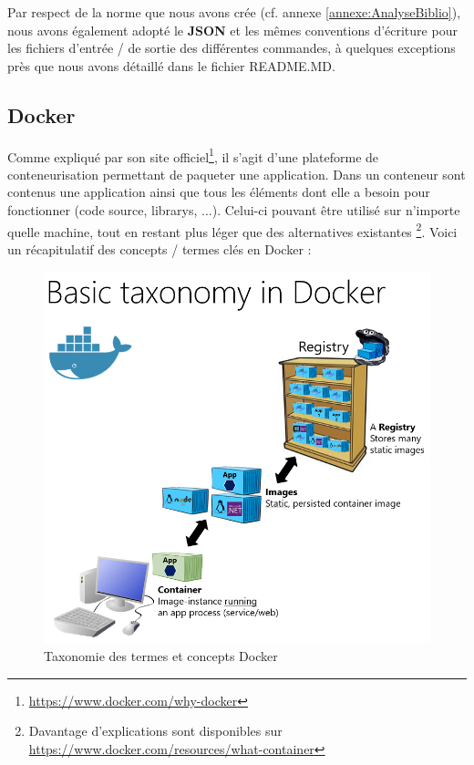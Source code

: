 Par respect de la norme que nous avons crée (cf. annexe \ref{annexe:AnalyseBiblio}), nous avons également adopté le \textbf{JSON} et les mêmes conventions d'écriture 
pour les fichiers d'entrée / de sortie des différentes commandes, à quelques exceptions près que nous avons détaillé dans le fichier README.MD. 

\pagebreak
\subsection{Docker}

Comme expliqué par son site officiel\footnote{
    \url{https://www.docker.com/why-docker}
}, il s'agit d'une plateforme de conteneurisation permettant de paqueter une application.
Dans un conteneur sont contenus une application ainsi que tous les éléments dont elle a besoin pour fonctionner (code source, \glspl{library}, ...).
Celui-ci pouvant être utilisé sur n'importe quelle machine, tout en restant plus léger que des alternatives existantes
\footnote{
    Davantage d'explications sont disponibles sur \url{https://www.docker.com/resources/what-container}
}.
Voici un récapitulatif des concepts / termes clés en Docker :

\begin{figure}[H]
    \includegraphics[width=\textwidth,height=0.38\textheight,keepaspectratio]{images/serveur/dockerTaxonomy.png}
    \centering
    \caption[Taxonomie des termes et concepts Docker]{Taxonomie des termes et concepts Docker \footnotemark}
    \label{fig:dockerTaxonomy}
\end{figure}

